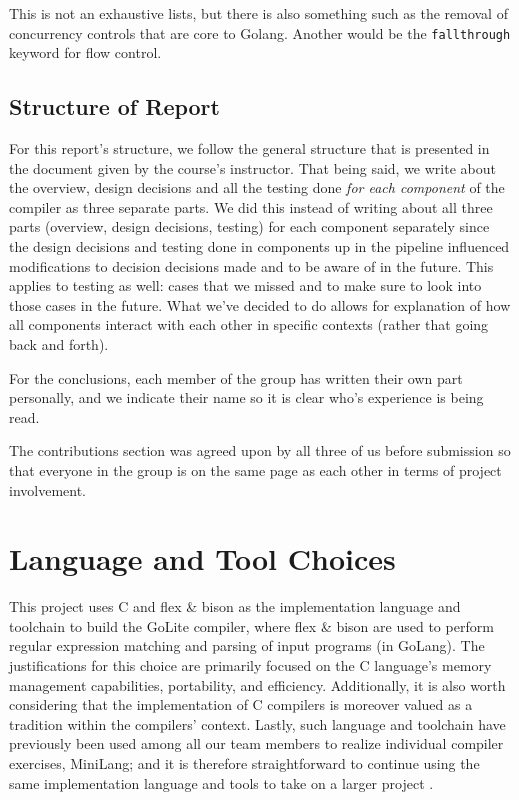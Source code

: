 \documentclass{article}
\begin{document}
This is not an exhaustive lists, but there is also something such as the removal of concurrency controls that are core to Golang. Another would be the \texttt{fallthrough} keyword for flow control.

\subsection{Structure of Report}

For this report's structure, we follow the general structure that is presented in the document given by the course's instructor. That being said, we write about the overview, design decisions and all the testing done \textit{for each component} of the compiler as three separate parts. We did this instead of writing about all three parts (overview, design decisions, testing) for each component separately since the design decisions and testing done in components up in the pipeline influenced modifications to decision decisions made and to be aware of in the future. This applies to testing as well: cases that we missed and to make sure to look into those cases in the future. What we've decided to do allows for explanation of how all components interact with each other in specific contexts (rather that going back and forth).

For the conclusions, each member of the group has written their own part personally, and we indicate their name so it is clear who's experience is being read.

The contributions section was agreed upon by all three of us before submission so that everyone in the group is on the same page as each other in terms of project involvement.


\section{Language and Tool Choices}
This project uses C and flex \& bison as the implementation language and toolchain to build the GoLite compiler, where flex \& bison are used to perform regular expression matching and parsing of input programs (in GoLang). The justifications for this choice are primarily focused on the C language’s memory management capabilities, portability, and efficiency. Additionally, it is also worth considering that the implementation of C compilers is moreover valued as a tradition within the compilers’ context. Lastly, such language and toolchain have previously been used among all our team members to realize individual compiler exercises, MiniLang; and it is therefore straightforward to continue using the same implementation language and tools to take on a larger project \citep{ass1, ass2}.
\end{document}
